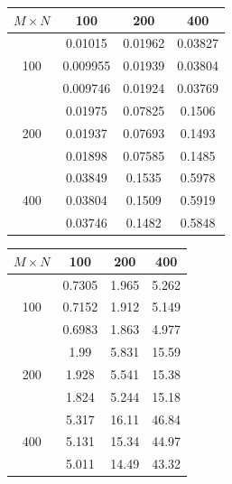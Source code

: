 \begin{minipage}[h]{0.47\textwidth}
\centering
\begin{tabular}{c|c|c|c|}
$M \times N$ & 100 & 200 & 400 \\
\hline
 & 0.01015 & 0.01962 & 0.03827 \\
100 & 0.009955 & 0.01939 & 0.03804 \\
 & 0.009746 & 0.01924 & 0.03769 \\
\hline
 & 0.01975 & 0.07825 & 0.1506 \\
200 & 0.01937 & 0.07693 & 0.1493 \\
 & 0.01898 & 0.07585 & 0.1485 \\
\hline
 & 0.03849 & 0.1535 & 0.5978 \\
400 & 0.03804 & 0.1509 & 0.5919 \\
 & 0.03746 & 0.1482 & 0.5848 \\
\hline
\end{tabular}
\end{minipage}
\hfill
\begin{minipage}[h]{0.47\textwidth}
\centering
\begin{tabular}{c|c|c|c|}
$M \times N$ & 100 & 200 & 400 \\
\hline
 & 0.7305 & 1.965 & 5.262 \\
100 & 0.7152 & 1.912 & 5.149 \\
 & 0.6983 & 1.863 & 4.977 \\
\hline
 & 1.99 & 5.831 & 15.59 \\
200 & 1.928 & 5.541 & 15.38 \\
 & 1.824 & 5.244 & 15.18 \\
\hline
 & 5.317 & 16.11 & 46.84 \\
400 & 5.131 & 15.34 & 44.97 \\
 & 5.011 & 14.49 & 43.32 \\
\hline
\end{tabular}
\end{minipage}
\vspace{1em}

